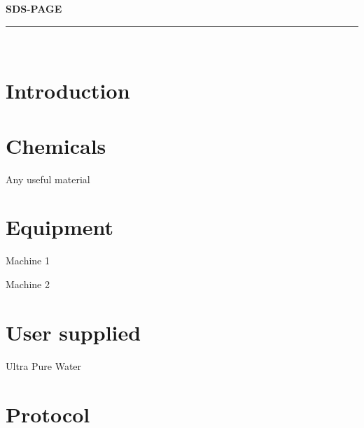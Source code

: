 \documentclass[a4paper,12pt]{article}
\newcommand{\protocol}{SDS-PAGE}
\newenvironment{packed_enum}{
\begin{enumerate}
  \setlength{\itemsep}{1pt}
  \setlength{\parskip}{0pt}
  \setlength{\parsep}{0pt}
}{\end{enumerate}}
\begin{document}
 
 
 
\begin{titlepage}
\begin{center}
{\LARGE \textbf{\protocol} \\ \vspace{4pt}}
\rule[13pt]{\textwidth}{1pt} \\ \vspace{150pt}
\end{center}
 
\end{titlepage}
 
\newpage
\thispagestyle{empty}           %
\tableofcontents
\clearpage                      %
 
\setcounter{page}{1}
 
\section{Introduction}

\section{Chemicals}
		Any useful material
\section{Equipment}
	\begin{packed_enum}
		\item Machine 1
		\item Machine 2
	\end{packed_enum}
 
\section{User supplied}
	\begin{packed_enum}
		\item Ultra Pure Water
	\end{packed_enum}
\section{Protocol}
\end{document}
